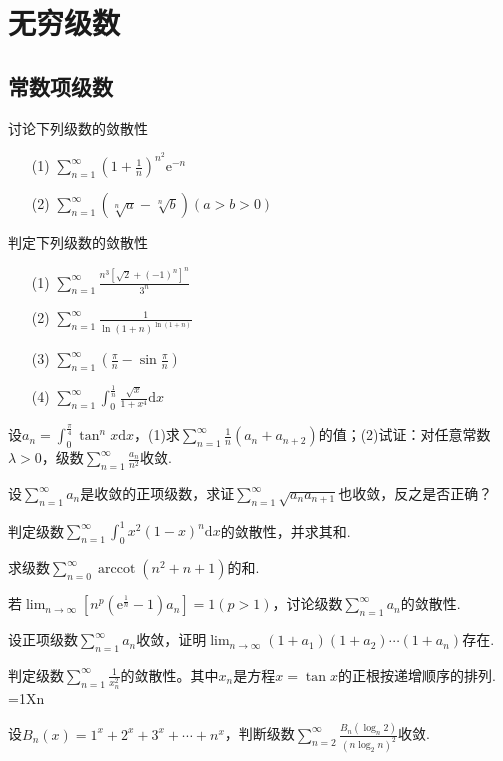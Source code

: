 \chapter{无穷级数}\label{cha:8}
\section{常数项级数}
\begin{xiti}
	\item 讨论下列级数的敛散性
	\begin{enumerate}
		\item [(1)]$\sum_{n=1}^{\infty}\left(1+\frac{1}{n}\right)^{n^{2}} \mathrm{e}^{-n}$
		\item [(2)]$\sum_{n=1}^{\infty}(\sqrt[n]{a}-\sqrt[n]{b})(a>b>0)$
	\end{enumerate}
	\item 判定下列级数的敛散性
		\begin{enumerate}
		\item [(1)]$\sum_{n=1}^{\infty} \frac{n^{3}\left[\sqrt{2}+(-1)^{n}\right]^{n}}{3^{n}}$
		\item [(2)]$\sum_{n=1}^{\infty} \frac{1}{\ln (1+n)^{\ln (1+n)}}$
		\item [(3)]$\sum_{n=1}^{\infty}\left(\frac{\pi}{n}-\sin \frac{\pi}{n}\right)$
		\item [(4)]$\sum_{n=1}^{\infty} \int_{0}^{\frac{1}{n}} \frac{\sqrt{x}}{1+x^{4}} \mathrm{d} x$
	\end{enumerate}
	\item 设$a_{n}=\int_{0}^{\frac{\pi}{4}} \tan ^{n} x \mathrm{d} x$，(1)求$\sum_{n=1}^{\infty} \frac{1}{n}\left(a_{n}+a_{n+2}\right)$的值；(2)试证：对任意常数$\lambda>0$，级数$\sum_{n=1}^{\infty} \frac{a_{n}}{n^{2}}$收敛.
	\item 设$\sum_{n=1}^{\infty} a_{n}$是收敛的正项级数，求证$\sum_{n=1}^{\infty} \sqrt{a_{n} a_{n+1}}$也收敛，反之是否正确？
	
	\item 判定级数$\sum_{n=1}^{\infty} \int_{0}^{1} x^{2}(1-x)^{n} \mathrm{d} x$的敛散性，并求其和.
	
	\item 求级数$\sum_{n=0}^{\infty} \operatorname{arccot}\left(n^{2}+n+1\right)$的和.
	\item 若$\lim _{n \rightarrow \infty}\left[n^{p}\left(\mathrm{e}^{\frac{1}{n}}-1\right) a_{n}\right]=1(p>1)$，讨论级数$\sum_{n=1}^{\infty} a_{n}$的敛散性.
	\item 设正项级数$\sum_{n=1}^{\infty} a_{n}$收敛，证明$\lim _{n \rightarrow \infty}\left(1+a_{1}\right)\left(1+a_{2}\right) \cdots\left(1+a_{n}\right)$存在.
	\item 判定级数$\sum_{n=1}^{\infty} \frac{1}{x_{n}^{2}}$的敛散性。其中$x_{n}$是方程$x=\tan x$的正根按递增顺序的排列.
	=1Xn
	\item 设$B_{n}(x)=1^{x}+2^{x}+3^{x}+\cdots+n^{x}$，判断级数$\sum_{n=2}^{\infty} \frac{B_{n}\left(\log _{n} 2\right)}{\left(n \log _{2} n\right)^{2}}$收敛.
	

\end{xiti}
